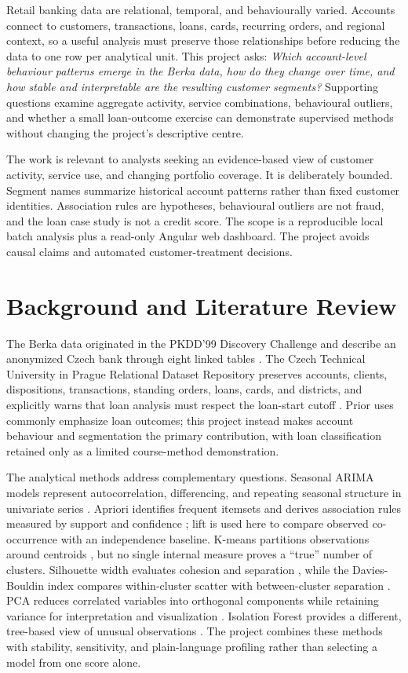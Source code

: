 \documentclass[conference]{IEEEtran}
\begin{document}
Retail banking data are relational, temporal, and behaviourally varied. Accounts connect to customers, transactions, loans, cards, recurring orders, and regional context, so a useful analysis must preserve those relationships before reducing the data to one row per analytical unit. This project asks: \emph{Which account-level behaviour patterns emerge in the Berka data, how do they change over time, and how stable and interpretable are the resulting customer segments?} Supporting questions examine aggregate activity, service combinations, behavioural outliers, and whether a small loan-outcome exercise can demonstrate supervised methods without changing the project's descriptive centre.

The work is relevant to analysts seeking an evidence-based view of customer activity, service use, and changing portfolio coverage. It is deliberately bounded. Segment names summarize historical account patterns rather than fixed customer identities. Association rules are hypotheses, behavioural outliers are not fraud, and the loan case study is not a credit score. The scope is a reproducible local batch analysis plus a read-only Angular web dashboard. The project avoids causal claims and automated customer-treatment decisions.

\section{Background and Literature Review}

The Berka data originated in the PKDD'99 Discovery Challenge and describe an anonymized Czech bank through eight linked tables \cite{pkdd1999}. The Czech Technical University in Prague Relational Dataset Repository preserves accounts, clients, dispositions, transactions, standing orders, loans, cards, and districts, and explicitly warns that loan analysis must respect the loan-start cutoff \cite{ctufinancial}. Prior uses commonly emphasize loan outcomes; this project instead makes account behaviour and segmentation the primary contribution, with loan classification retained only as a limited course-method demonstration.

The analytical methods address complementary questions. Seasonal ARIMA models represent autocorrelation, differencing, and repeating seasonal structure in univariate series \cite{hyndman2008}. Apriori identifies frequent itemsets and derives association rules measured by support and confidence \cite{agrawal1994}; lift is used here to compare observed co-occurrence with an independence baseline. K-means partitions observations around centroids \cite{macqueen1967}, but no single internal measure proves a ``true'' number of clusters. Silhouette width evaluates cohesion and separation \cite{rousseeuw1987}, while the Davies-Bouldin index compares within-cluster scatter with between-cluster separation \cite{davies1979}. PCA reduces correlated variables into orthogonal components while retaining variance for interpretation and visualization \cite{jolliffe2016}. Isolation Forest provides a different, tree-based view of unusual observations \cite{liu2008}. The project combines these methods with stability, sensitivity, and plain-language profiling rather than selecting a model from one score alone.
\end{document}
